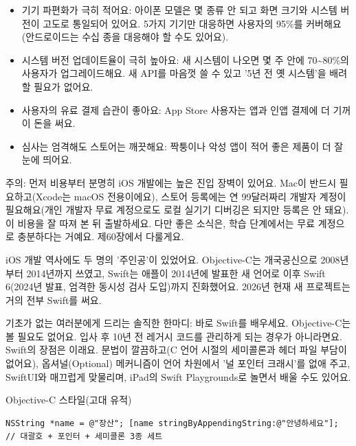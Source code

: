 \begin{itemize}
  \item 기기 파편화가 극히 적어요: 아이폰 모델은 몇 종류 안 되고 화면 크기와 시스템 버전이 고도로 통일되어 있어요. 5가지 기기만 대응하면 사용자의 95\%를 커버해요(안드로이드는 수십 종을 대응해야 할 수도 있어요).
  \item 시스템 버전 업데이트율이 극히 높아요: 새 시스템이 나오면 몇 주 안에 70\textasciitilde{}80\%의 사용자가 업그레이드해요. 새 API를 마음껏 쓸 수 있고 '5년 전 옛 시스템'을 배려할 필요가 없어요.
  \item 사용자의 유료 결제 습관이 좋아요: App Store 사용자는 앱과 인앱 결제에 더 기꺼이 돈을 써요.
  \item 심사는 엄격해도 스토어는 깨끗해요: 짝퉁이나 악성 앱이 적어 좋은 제품이 더 잘 눈에 띄어요.
\end{itemize}

\begin{tcbwarn}{주의: 먼저 비용부터 분명히}
iOS 개발에는 높은 진입 장벽이 있어요. Mac이 반드시 필요하고(Xcode는 macOS 전용이에요), 스토어 등록에는 연 99달러짜리 개발자 계정이 필요해요(개인 개발자 무료 계정으로도 로컬 실기기 디버깅은 되지만 등록은 안 돼요). 이 비용을 잘 따져 본 뒤 출발하세요. 다만 좋은 소식은, 학습 단계에서는 무료 계정으로 충분하다는 거예요. 제60장에서 다룰게요.

\end{tcbwarn}


iOS 개발 역사에도 두 명의 '주인공'이 있었어요. Objective-C는 개국공신으로 2008년부터 2014년까지 쓰였고, Swift는 애플이 2014년에 발표한 새 언어로 이후 Swift 6(2024년 발표, 엄격한 동시성 검사 도입)까지 진화했어요. 2026년 현재 새 프로젝트는 거의 전부 Swift를 써요.

기초가 없는 여러분에게 드리는 솔직한 한마디: 바로 Swift를 배우세요. Objective-C는 볼 필요도 없어요. 입사 후 10년 전 레거시 코드를 관리하게 되는 경우가 아니라면요. Swift의 장점은 이래요. 문법이 깔끔하고(C 언어 시절의 세미콜론과 헤더 파일 부담이 없어요), 옵셔널(Optional) 메커니즘이 언어 차원에서 '널 포인터 크래시'를 없애 주고, SwiftUI와 매끄럽게 맞물리며, iPad의 Swift Playgrounds로 놀면서 배울 수도 있어요.

Objective-C 스타일(고대 유적)

\begin{lstlisting}
NSString *name = @"장산"; [name stringByAppendingString:@"안녕하세요"]; // 대괄호 + 포인터 + 세미콜론 3종 세트
\end{lstlisting}

